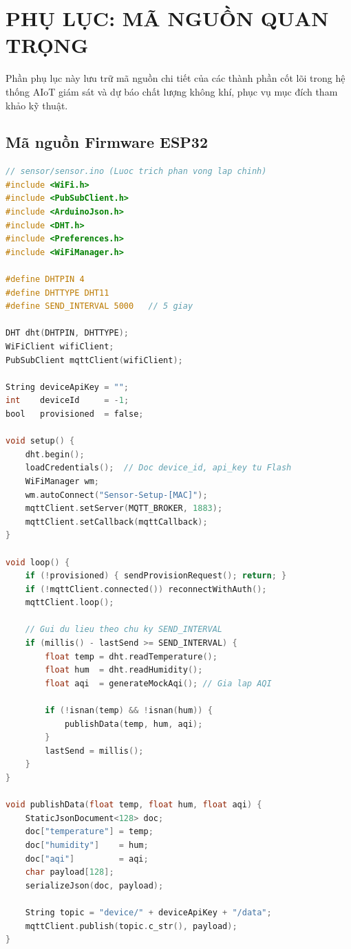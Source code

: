 \chapter{PHỤ LỤC: MÃ NGUỒN QUAN TRỌNG}
\label{chap:appendix}

Phần phụ lục này lưu trữ mã nguồn chi tiết của các thành phần cốt lõi trong hệ thống AIoT giám sát và dự báo chất lượng không khí, phục vụ mục đích tham khảo kỹ thuật.

\section{Mã nguồn Firmware ESP32}

\begin{lstlisting}[language=C, caption={Luồng xử lý chính của Firmware ESP32}, label={lst:firmware_main}]
// sensor/sensor.ino (Luoc trich phan vong lap chinh)
#include <WiFi.h>
#include <PubSubClient.h>
#include <ArduinoJson.h>
#include <DHT.h>
#include <Preferences.h>
#include <WiFiManager.h>

#define DHTPIN 4
#define DHTTYPE DHT11
#define SEND_INTERVAL 5000   // 5 giay

DHT dht(DHTPIN, DHTTYPE);
WiFiClient wifiClient;
PubSubClient mqttClient(wifiClient);

String deviceApiKey = "";
int    deviceId     = -1;
bool   provisioned  = false;

void setup() {
    dht.begin();
    loadCredentials();  // Doc device_id, api_key tu Flash
    WiFiManager wm;
    wm.autoConnect("Sensor-Setup-[MAC]");
    mqttClient.setServer(MQTT_BROKER, 1883);
    mqttClient.setCallback(mqttCallback);
}

void loop() {
    if (!provisioned) { sendProvisionRequest(); return; }
    if (!mqttClient.connected()) reconnectWithAuth();
    mqttClient.loop();

    // Gui du lieu theo chu ky SEND_INTERVAL
    if (millis() - lastSend >= SEND_INTERVAL) {
        float temp = dht.readTemperature();
        float hum  = dht.readHumidity();
        float aqi  = generateMockAqi(); // Gia lap AQI

        if (!isnan(temp) && !isnan(hum)) {
            publishData(temp, hum, aqi);
        }
        lastSend = millis();
    }
}

void publishData(float temp, float hum, float aqi) {
    StaticJsonDocument<128> doc;
    doc["temperature"] = temp;
    doc["humidity"]    = hum;
    doc["aqi"]         = aqi;
    char payload[128];
    serializeJson(doc, payload);

    String topic = "device/" + deviceApiKey + "/data";
    mqttClient.publish(topic.c_str(), payload);
}
\end{lstlisting}

